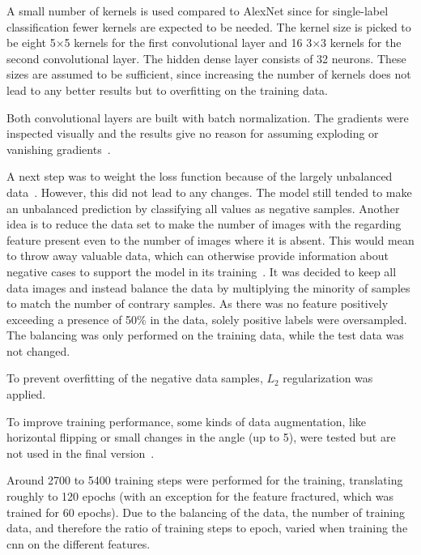 A small number of kernels is used compared to AlexNet since for single-label classification fewer kernels are expected to be needed. The kernel size is picked to be eight 5$\times$5 kernels for the first convolutional layer and 16 3$\times$3 kernels for the second convolutional layer. The hidden dense layer consists of 32 neurons. These sizes are assumed to be sufficient, since increasing the number of kernels does not lead to any better results but to overfitting on the training data.
 
Both convolutional layers are built with batch normalization. The gradients were inspected visually and the results give no reason for assuming exploding or vanishing gradients~\citep{pascanu2012understanding}.
 
A next step was to weight the loss function because of the largely unbalanced data~\citep{he2009learning,batista2004study}. However, this did not lead to any changes. The model still tended to make an unbalanced prediction by classifying all values as negative samples. Another idea is to reduce the data set to make the number of images with the regarding feature present even to the number of images where it is absent. This would mean to throw away valuable data, which can otherwise provide information about negative cases to support the model in its training~\citep{batista2004study}. It was decided to keep all data images and instead balance the data by multiplying the minority of samples to match the number of contrary samples. As there was no feature positively exceeding a presence of 50\% in the data, solely positive labels were oversampled. The balancing was only performed on the training data, while the test data was not changed.
 
To prevent overfitting of the negative data samples, \(L_2\) regularization was applied.
 
To improve training performance, some kinds of data augmentation, like horizontal flipping or small changes in the angle (up to 5\textdegree ), were tested but are not used in the final version~\citep{brownlee2019augmentation}.

\bigskip
Around 2700 to 5400 training steps were performed for the training, translating roughly to 120 epochs (with an exception for the feature fractured, which was trained for 60 epochs). Due to the balancing of the data, the number of training data, and therefore the ratio of training steps to epoch, varied when training the \acrshort{cnn} on the different features.

